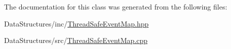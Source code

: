 The documentation for this class was generated from the following files\+:\begin{DoxyCompactItemize}
\item 
Data\+Structures/inc/\hyperlink{_thread_safe_event_map_8hpp}{Thread\+Safe\+Event\+Map.\+hpp}\item 
Data\+Structures/src/\hyperlink{_thread_safe_event_map_8cpp}{Thread\+Safe\+Event\+Map.\+cpp}\end{DoxyCompactItemize}
